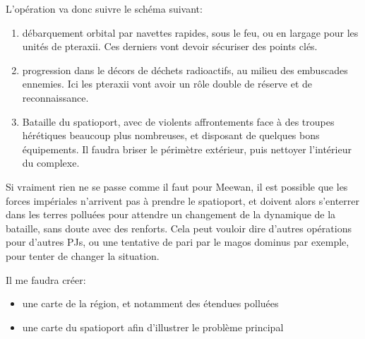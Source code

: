 \documentclass[10pt,a4paper]{book}
\begin{document}
L'opération va donc suivre le schéma suivant:
\begin{enumerate}
\item débarquement orbital par navettes rapides, sous le feu, ou en largage pour les unités de pteraxii. Ces derniers vont devoir sécuriser des points clés.
\item progression dans le décors de déchets radioactifs, au milieu des embuscades ennemies. Ici les pteraxii vont avoir un rôle double de réserve et de reconnaissance.
\item Bataille du spatioport, avec de violents affrontements face à des troupes hérétiques beaucoup plus nombreuses, et disposant de quelques bons équipements. Il faudra briser le périmètre extérieur, puis nettoyer l'intérieur du complexe.
\end{enumerate}

Si vraiment rien ne se passe comme il faut pour Meewan, il est possible que les forces impériales n'arrivent pas à prendre le spatioport, et doivent alors s'enterrer dans les terres polluées pour attendre un changement de la dynamique de la bataille, sans doute avec des renforts. Cela peut vouloir dire d'autres opérations pour d'autres PJs, ou une tentative de pari par le magos dominus par exemple, pour tenter de changer la situation.

Il me faudra créer:
\begin{itemize}
\item une carte de la région, et notamment des étendues polluées
\item une carte du spatioport afin d'illustrer le problème principal
\end{itemize}
\end{document}
